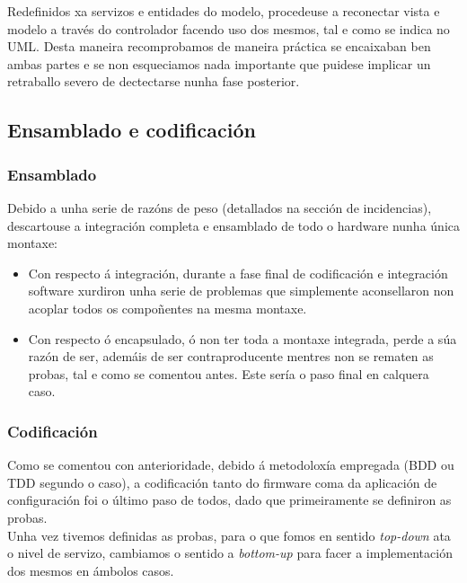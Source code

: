   Redefinidos xa servizos e entidades do modelo, procedeuse a reconectar vista
   e modelo a través do controlador facendo uso dos mesmos, tal e como se indica
   no UML. Desta maneira recomprobamos de maneira práctica se encaixaban ben
   ambas partes e se non esqueciamos nada importante que puidese implicar un
   retraballo severo de dectectarse nunha fase posterior.

 \subsection{Ensamblado e codificación}

  \subsubsection{Ensamblado}
  
  Debido a unha serie de razóns de peso (detallados na sección de incidencias),
  descartouse a integración completa e ensamblado de todo o hardware nunha única
  montaxe:
  
  \begin{itemize}
    \item Con respecto á integración, durante a fase final de codificación
        e integración software xurdiron unha serie de problemas que simplemente
        aconsellaron non acoplar todos os compoñentes na mesma montaxe.
    \item Con respecto ó encapsulado, ó non ter toda a montaxe integrada, perde
        a súa razón de ser, ademáis de ser contraproducente mentres non se
        rematen as probas, tal e como se comentou antes. Este sería o paso final
        en calquera caso.
   \end{itemize}

  \subsubsection{Codificación}
  
  Como se comentou con anterioridade, debido á metodoloxía empregada (BDD ou
  TDD segundo o caso), a codificación tanto do firmware coma da aplicación de
  configuración foi o último paso de todos, dado que primeiramente se definiron
  as probas. \\
  
  Unha vez tivemos definidas as probas, para o que fomos en sentido
  \textit{top-down} ata o nivel de servizo, cambiamos o sentido a
  \textit{bottom-up} para facer a implementación dos mesmos en ámbolos casos.
  
